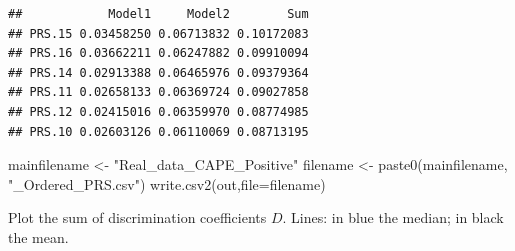 \documentclass[
]{article}
\newenvironment{Shaded}{\begin{snugshade}}{\end{snugshade}}
\newcommand{\AttributeTok}[1]{\textcolor[rgb]{0.77,0.63,0.00}{#1}}
\newcommand{\FunctionTok}[1]{\textcolor[rgb]{0.00,0.00,0.00}{#1}}
\newcommand{\NormalTok}[1]{#1}
\newcommand{\OtherTok}[1]{\textcolor[rgb]{0.56,0.35,0.01}{#1}}
\newcommand{\StringTok}[1]{\textcolor[rgb]{0.31,0.60,0.02}{#1}}
\begin{document}
\begin{verbatim}
##            Model1     Model2        Sum
## PRS.15 0.03458250 0.06713832 0.10172083
## PRS.16 0.03662211 0.06247882 0.09910094
## PRS.14 0.02913388 0.06465976 0.09379364
## PRS.11 0.02658133 0.06369724 0.09027858
## PRS.12 0.02415016 0.06359970 0.08774985
## PRS.10 0.02603126 0.06110069 0.08713195
\end{verbatim}

\begin{Shaded}
\begin{Highlighting}[]
\NormalTok{mainfilename }\OtherTok{\textless{}{-}} \StringTok{"Real\_data\_CAPE\_Positive"}
\NormalTok{filename }\OtherTok{\textless{}{-}} \FunctionTok{paste0}\NormalTok{(mainfilename, }\StringTok{"\_Ordered\_PRS.csv"}\NormalTok{)}
\FunctionTok{write.csv2}\NormalTok{(out,}\AttributeTok{file=}\NormalTok{filename)}
\end{Highlighting}
\end{Shaded}

Plot the sum of discrimination coefficients \(D\). Lines: in blue the
median; in black the mean.
\end{document}

